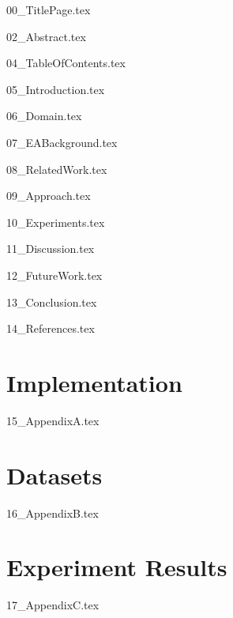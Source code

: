 \documentclass[version=last, pagesize=auto, paper=a4]{report}%
\numberwithin{equation}{section}
\begin{document}
	
\renewcommand{\baselinestretch}{1.0}\normalsize
{00_TitlePage.tex}
\renewcommand{\baselinestretch}{1.3}\normalsize


{02_Abstract.tex}


\renewcommand{\baselinestretch}{1.0}\normalsize
{04_TableOfContents.tex}
\renewcommand{\baselinestretch}{1.3}\normalsize

{05_Introduction.tex}

\graphicspath{ {./Figures/06_Domain/} }
{06_Domain.tex}

\graphicspath{ {./Figures/07_EABackground/} }
{07_EABackground.tex}

{08_RelatedWork.tex}

\graphicspath{ {./Figures/09_Approach/} }
{09_Approach.tex}

\graphicspath{ {./Figures/10_Experiments/} }
{10_Experiments.tex}

{11_Discussion.tex}

{12_FutureWork.tex}

{13_Conclusion.tex}

{14_References.tex}

\newpage
\begin{appendices}
    \chapter{Implementation}
        {15_AppendixA.tex}
    \chapter{Datasets}
        {16_AppendixB.tex}
    \chapter{Experiment Results}
	    {17_AppendixC.tex}
\end{appendices}
\end{document}
